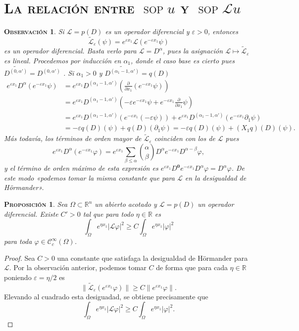 \documentclass[11pt]{article}
\theoremstyle{colored}
\DeclareMathOperator{\sop}{sop}
\newtheorem{proposition}{\scshape Proposición}
\newtheorem{remark}{\scshape Observación}
\newcommand{\R}{\mathbb{R}}
\newcommand{\C}{\mathscr{C}}
\newcommand{\eps}{\varepsilon}
\newcommand{\guill}[1]{«#1»}
\renewcommand{\L}{\mathscr{L}}
\begin{document}
\section{\scshape La relación entre $\sop u$ y $\sop \L u$}

\begin{remark} Si $\L = p(D)$ es un operador diferencial y $\eps > 0$, entonces
\[
\widetilde{\L}_\eps(\psi) = e^{\eps x_1}\L(e^{-\eps x_1}\psi)
\]
es un operador diferencial. Basta verlo para $\L = D^\alpha$, pues la asignación $\L \mapsto \widetilde{\L}_\eps$ es lineal. Procedemos por inducción en $\alpha_1$, donde el caso base es cierto pues $\widetilde{D^{(0,\alpha')}} = D^{(0,\alpha')}$ . Si $\alpha_1 > 0$ y $\widetilde{D^{(\alpha_1 - 1, \alpha')}} = q(D)$
\begin{align*}
e^{\eps x_1}D^\alpha(e^{-\eps x_1}\psi) &= e^{\eps x_1}D^{(\alpha_1 - 1, \alpha')}\left(\frac{\partial}{\partial x_1}(e^{-\eps x_1}\psi)\right)\\
&= e^{\eps x_1}D^{(\alpha_1 - 1, \alpha')}\left(-\eps e^{-\eps x_1}\psi + e^{-\eps x_1}\frac{\partial}{\partial x_1}\psi\right)\\
&= e^{\eps x_1}D^{(\alpha_1 - 1, \alpha')}(e^{-\eps x_1}(-\eps\psi)) + e^{\eps x_1}D^{(\alpha_1 - 1, \alpha')}(e^{-\eps x_1}\partial_1\psi)\\
&= -\eps q(D)(\psi) + q(D)(\partial_1\psi) = -\eps q(D)(\psi) + (X_1q)(D)(\psi).
\end{align*}
Más todavía, los términos de orden mayor de $\widetilde{\L}_\eps$ coinciden con los de $\L$ pues
\[
e^{\eps x_1}D^\alpha (e^{-\eps x_1}\varphi) = e^{\eps x_1}\sum_{\beta \leq \alpha}{\alpha \choose \beta}D^\alpha e^{-\eps x_1}D^{\alpha - \beta}\varphi,
\]
y el término de orden máximo de esta expresión es $e^{\eps x_1}D^{\mathbf{0}}e^{-\eps x_1}D^{\alpha}\varphi = D^\alpha\varphi$. De este modo \guill{podemos tomar la misma constante que para $\L$ en la desigualdad de Hörmander}.
\end{remark}

\begin{proposition} \label{sharp-hormander-bound}Sea $\Omega \subset \R^n$ un abierto acotado y $\L = p(D)$ un operador diferencial. Existe $C' > 0$ tal que para todo $\eta \in \R$ es
\[
\int_{\Omega}e^{\eta x_1}|\L \varphi|^2 \geq C \int_{\Omega}e^{\eta x_1}|\varphi|^2
\]
para toda $\varphi \in \C_c^\infty(\Omega)$.
\end{proposition}
\begin{proof} Sea $C > 0$ una constante que satisfaga la desigualdad de Hörmander para $\L$. Por la observación anterior, podemos tomar $C$ de forma que para cada $\eta \in \R$ poniendo $\eps = \eta/2$ es
\[
\|\widetilde{\L}_\eps( e^{\eps x_1}\varphi)\| \geq C \|e^{\eps x_1}\varphi\|.
\]
Elevando al cuadrado esta desiguadad, se obtiene precisamente que
\[
\int_{\Omega}e^{\eta x_1}|\L \varphi|^2 \geq C \int_{\Omega}e^{\eta x_1}|\varphi|^2.
\]
\end{proof}
\end{document}
